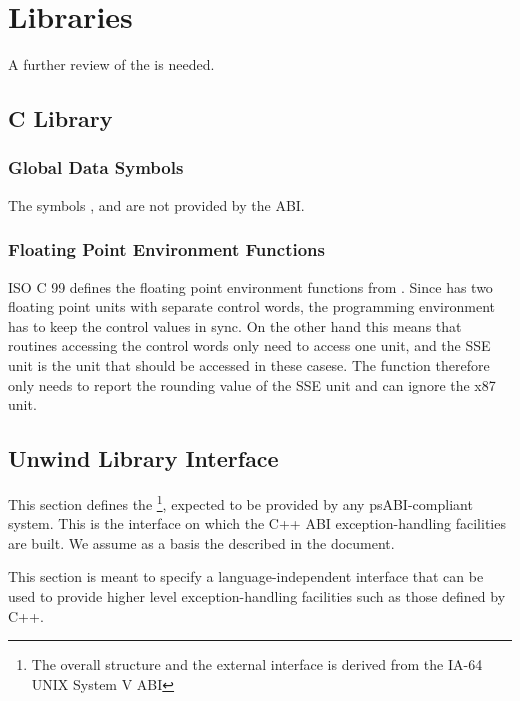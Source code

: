\chapter{Libraries}

A further review of the \intelabi is needed.

\section{C Library}

\subsection{Global Data Symbols}

The symbols ,  and 
are not provided by the \xARCH ABI.

\subsection{Floating Point Environment Functions}

ISO C 99 defines the floating point environment functions from
.  Since \xARCH has two floating point units with
separate control words, the programming environment has to keep the
control values in sync.  On the other hand this means that routines
accessing the control words only need to access one unit, and the SSE
unit is the unit that should be accessed in these casese.  The
function  therefore only needs to report the
rounding value of the SSE unit and can ignore the x87 unit.

\section{Unwind Library Interface}

This section defines the %
\footnote{The overall structure and the external interface is derived
from the IA-64 UNIX System V ABI},
expected to be provided by any \xARCH psABI-compliant system.
This is the interface on which the C++ ABI exception-handling
facilities are built. We assume as a basis the
 described in the
 document.

This section is meant to specify a language-independent interface that
can be used to provide higher level exception-handling facilities such
as those defined by C++.

